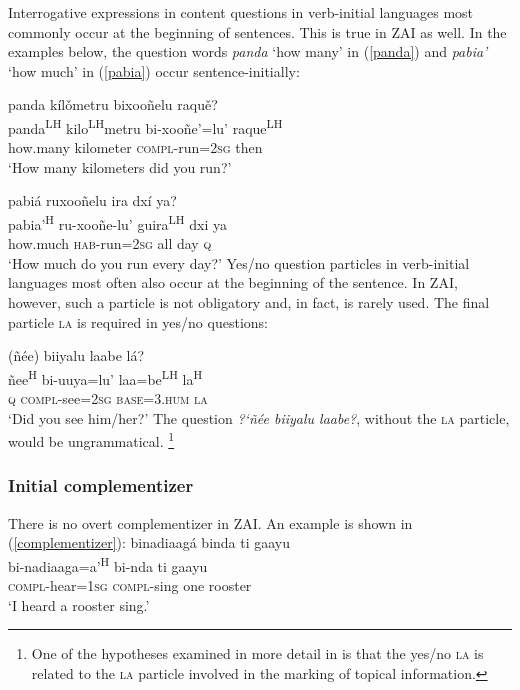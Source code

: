Interrogative expressions in content questions in verb-initial languages most commonly occur at the beginning of sentences. This is true in ZAI as well. In the examples below, the question words \textit{panda} `how many' in (\ref{panda}) and \textit{pabia'} `how much' in (\ref{pabia}) occur sentence-initially:

\ea\label{panda}
panda k\'{i}l\v{o}metru bixooñelu raqu\v{e}?  \\
panda\textsuperscript{LH} kilo\textsuperscript{LH}metru bi-xooñe'=lu' raque\textsuperscript{LH} \\
how.many kilometer \textsc{compl}-run=\textsc{2sg} then \\
\glt `How many kilometers did you run?'
\z

\ea\label{pabia}
pabiá ruxooñelu ira dx\'{i} ya? \\
pabia'\textsuperscript{H} ru-xooñe-lu' guira\textsuperscript{LH} dxi ya \\
how.much \textsc{hab}-run=\textsc{2sg} all day \textsc{q} \\
\glt `How much do you run every day?'	
\z
Yes/no question particles in verb-initial languages most often also occur at the beginning of the sentence. In ZAI, however, such a particle is not obligatory and, in fact, is rarely used. The final particle \textsc{la} is required in yes/no questions:

\ea
{}(ñée) biiyalu laabe lá? \\
ñee\textsuperscript{H} bi-uuya=lu' laa=be\textsuperscript{LH} la\textsuperscript{H} \\
\textsc{q} \textsc{compl}-see=\textsc{2sg} \textsc{base}=\textsc{3.hum} \textsc{la} \\
\glt `Did you see him/her?'
\z
The question \textit{{?`}ñée biiyalu laabe?}, without the \textsc{la} particle, would be ungrammatical. \footnote{One of the hypotheses examined in more detail in  is that the yes/no  \textsc{la} is related to the \textsc{la} particle involved in the marking of topical information.}


\subsubsection{Initial complementizer}

There is no overt complementizer in ZAI. An example is shown in (\ref{complementizer}):
\ea\label{complementizer}
\glll binadiaagá binda ti gaayu \\
bi-nadiaaga=a'\textsuperscript{H} bi-nda ti gaayu \\
\textsc{compl}-hear=\textsc{1sg} \textsc{compl}-sing one rooster \\
\glt `I heard a rooster sing.'
\z


